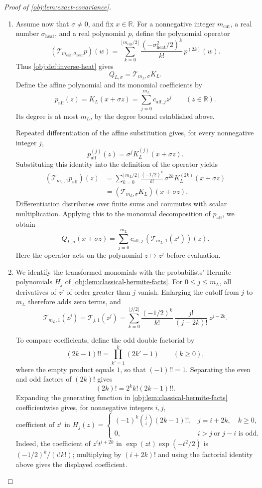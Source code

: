 \begin{proof}[Proof of \cref{obj:lem:exact-covariance}]
\begin{enumerate}
\item Assume now that \(\sigma\ne0\), and fix \(x\in\mathbb R\). For a nonnegative integer \(m_{\mathrm{cut}}\), a real number \(\sigma_{\mathrm{heat}}\), and a real polynomial \(p\), define the polynomial operator
\[
(\mathcal T_{m_{\mathrm{cut}},\sigma_{\mathrm{heat}}}p)(w)
=
\sum_{k=0}^{\lfloor m_{\mathrm{cut}}/2\rfloor}
\frac{(-\sigma_{\mathrm{heat}}^2/2)^k}{k!}\,
p^{(2k)}(w).
\]
Thus \cref{obj:def:inverse-heat} gives
\[
Q_{L,\sigma}=\mathcal T_{m_L,\sigma}K_L.
\]
Define the affine polynomial and its monomial coefficients by
\[
p_{\mathrm{aff}}(z)=K_L(x+\sigma z)
=\sum_{j=0}^{m_L}c_{\mathrm{aff},j}z^j
\qquad(z\in\mathbb R).
\]
Its degree is at most \(m_L\), by the degree bound established above.

Repeated differentiation of the affine substitution gives, for every nonnegative integer \(j\),
\[
p_{\mathrm{aff}}^{(j)}(z)
=\sigma^jK_L^{(j)}(x+\sigma z).
\]
Substituting this identity into the definition of the operator yields
\[
\begin{aligned}
(\mathcal T_{m_L,1}p_{\mathrm{aff}})(z)
&=
\sum_{k=0}^{\lfloor m_L/2\rfloor}
\frac{(-1/2)^k}{k!}\,
\sigma^{2k}K_L^{(2k)}(x+\sigma z)\\
&=
(\mathcal T_{m_L,\sigma}K_L)(x+\sigma z).
\end{aligned}
\]
Differentiation distributes over finite sums and commutes with scalar multiplication. Applying this to the monomial decomposition of \(p_{\mathrm{aff}}\), we obtain
\[
Q_{L,\sigma}(x+\sigma z)
=
\sum_{j=0}^{m_L}
c_{\mathrm{aff},j}\,
(\mathcal T_{m_L,1}(z^j))(z).
\]
Here the operator acts on the polynomial \(z\mapsto z^j\) before evaluation.

\item We identify the transformed monomials with the probabilists' Hermite polynomials \(H_j\) of \cref{obj:lem:classical-hermite-facts}. For \(0\le j\le m_L\), all derivatives of \(z^j\) of order greater than \(j\) vanish. Enlarging the cutoff from \(j\) to \(m_L\) therefore adds zero terms, and
\[
\mathcal T_{m_L,1}(z^j)
=
\mathcal T_{j,1}(z^j)
=
\sum_{k=0}^{\lfloor j/2\rfloor}
\frac{(-1/2)^k}{k!}\,
\frac{j!}{(j-2k)!}\,z^{j-2k}.
\]

To compare coefficients, define the odd double factorial by
\[
(2k-1)!!=\prod_{k'=1}^{k}(2k'-1)
\qquad(k\ge0),
\]
where the empty product equals \(1\), so that \((-1)!!=1\).
Separating the even and odd factors of \((2k)!\) gives
\[
(2k)!=2^k k!(2k-1)!!.
\]
Expanding the generating function in \cref{obj:lem:classical-hermite-facts} coefficientwise gives, for nonnegative integers \(i,j\),
\[
\text{coefficient of \(z^i\) in \(H_j(z)\)}
=
\begin{cases}
(-1)^k\binom ji(2k-1)!!,
& j=i+2k,\quad k\ge0,\\
0,
& i>j\ \text{or }j-i\text{ is odd}.
\end{cases}
\]
Indeed, the coefficient of \(z^it^{i+2k}\) in
\(\exp(zt)\exp(-t^2/2)\) is
\((-1/2)^k/(i!k!)\); multiplying by \((i+2k)!\) and using the factorial identity above gives the displayed coefficient.


\end{enumerate}
\end{proof}
